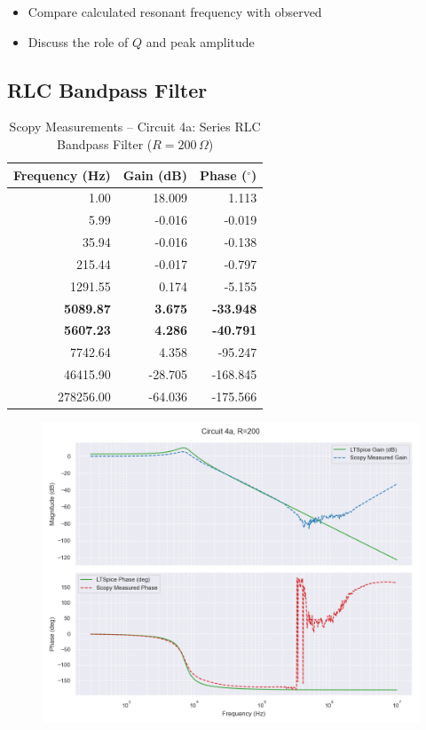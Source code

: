 \documentclass[12pt]{article}
\begin{document}
\begin{itemize}
	\item Compare calculated resonant frequency with observed
	\item Discuss the role of $Q$ and peak amplitude
\end{itemize}

\subsection{RLC Bandpass Filter}

\begin{table}[H]
	\centering
	\caption{Scopy Measurements – Circuit 4a: Series RLC Bandpass Filter ($R=200\,\Omega$)}
	\begin{tabular}{|r|r|r|}
		\hline
		\textbf{Frequency (Hz)} & \textbf{Gain (dB)} & \textbf{Phase ($^\circ$)} \\
		\hline
		1.00                    & 18.009             & 1.113                     \\
		5.99                    & -0.016             & -0.019                    \\
		35.94                   & -0.016             & -0.138                    \\
		215.44                  & -0.017             & -0.797                    \\
		1291.55                 & 0.174              & -5.155                    \\
		\textbf{5089.87}        & \textbf{3.675}     & \textbf{-33.948}          \\
		\textbf{5607.23}        & \textbf{4.286}     & \textbf{-40.791}          \\
		7742.64                 & 4.358              & -95.247                   \\
		46415.90                & -28.705            & -168.845                  \\
		278256.00               & -64.036            & -175.566                  \\
		\hline
	\end{tabular}
\end{table}
\begin{figure}[H]
	\includegraphics[width=\textwidth]{e6_bode4}
\end{figure}
\end{document}
